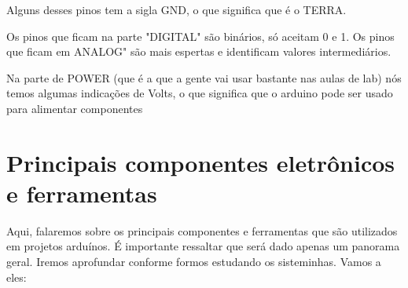 \documentclass{report}
\begin{document}
	Alguns desses pinos tem a sigla GND, o que significa que é o TERRA.
	
	Os pinos que ficam na parte "DIGITAL" são binários, só aceitam 0 e 1. Os pinos que ficam em ANALOG" são mais espertas e identificam valores intermediários.
	
	Na parte de POWER (que é a que a gente vai usar bastante nas aulas de lab) nós temos algumas indicações de Volts, o que significa que o arduino pode ser usado para alimentar componentes
	
	
	
	\section{Principais componentes eletrônicos e ferramentas}
	
	Aqui, falaremos sobre os principais componentes e ferramentas que são utilizados em projetos arduínos. 
	É importante ressaltar que será dado apenas um panorama geral. 
	Iremos aprofundar conforme formos estudando os sisteminhas. Vamos a eles:
	
\end{document}
